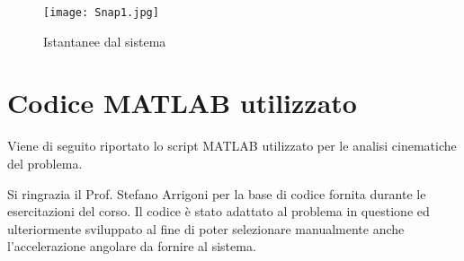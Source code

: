 \documentclass{article}
\begin{document}
\begin{figure}[h!]
    \centering
    \texttt{[image: Snap1.jpg]}
    \caption{Istantanee dal sistema}
    \label{fig:6}
\end{figure}

\section{Codice MATLAB utilizzato}
Viene di seguito riportato lo script MATLAB utilizzato per le analisi cinematiche del problema. 

\bigskip 

Si ringrazia il Prof. Stefano Arrigoni per la base di codice fornita durante le esercitazioni del corso. Il codice è stato adattato al problema in questione ed ulteriormente sviluppato al fine di poter selezionare manualmente anche l'accelerazione angolare da fornire al sistema.

\bigskip
\end{document}
